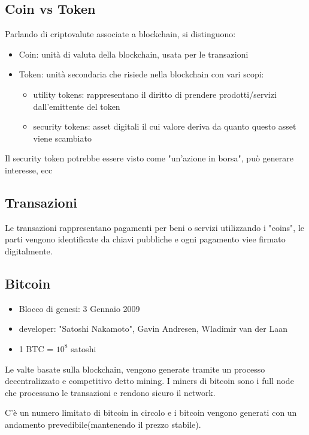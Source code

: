 \subsection{Coin vs Token}
Parlando di criptovalute associate a blockchain, si distinguono:
\begin{itemize}
    \item Coin: unità di valuta della blockchain, usata per le transazioni
    \item Token: unità secondaria che risiede nella blockchain con vari scopi:
        \begin{itemize}
            \item utility tokens: rappresentano il diritto di prendere prodotti/servizi dall'emittente del token
            \item security tokens: asset digitali il cui valore deriva da quanto questo asset viene scambiato
        \end{itemize}
\end{itemize}

Il security token potrebbe essere visto come "un'azione in borsa", può generare interesse, ecc


\subsection{Transazioni}
Le transazioni rappresentano pagamenti per beni o servizi utilizzando i "coins", 
le parti vengono identificate da chiavi pubbliche e 
ogni pagamento viee firmato digitalmente.

\subsection{Bitcoin}
\begin{itemize}
    \item Blocco di genesi: 3 Gennaio 2009
    \item developer: "Satoshi Nakamoto", Gavin Andresen, Wladimir van der Laan
    \item 1 BTC = $10^8$ satoshi
\end{itemize}

Le valte basate sulla blockchain, vengono generate tramite un processo decentralizzato e competitivo
detto mining.
I miners di bitcoin sono i full node che processano le transazioni e rendono sicuro il network.

C'è un numero limitato di bitcoin in circolo e i bitcoin vengono generati con un andamento 
prevedibile(mantenendo il prezzo stabile).

